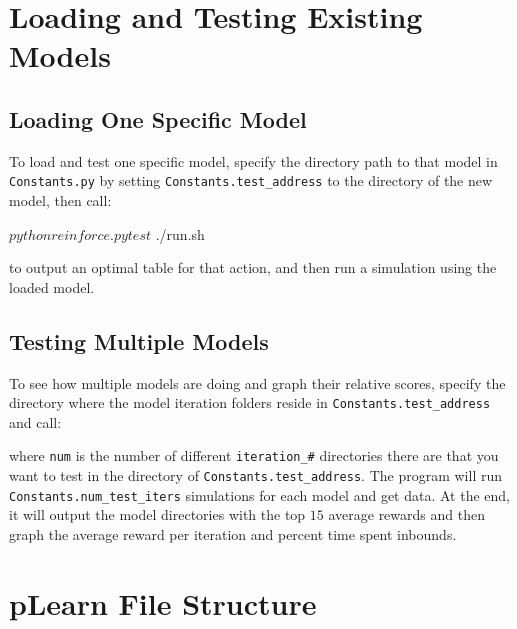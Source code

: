\documentclass[onecolumn,letterpaper,11pt]{article}
\begin{document}
\section{Loading and Testing Existing Models}

\subsection{Loading One Specific Model}
To load and test one specific model, specify the directory path to that model in \texttt{Constants.py} by setting \texttt{Constants.test\_address} to the directory of the new model, then call:

\vspace{0.15in}
\begin{fileverb} 
$ python reinforce.py test
$ ./run.sh	
\end{fileverb}
\vspace{0.15in}
 
to output an optimal table for that action, and then run a simulation using the loaded model.

\subsection{Testing Multiple Models}
To see how multiple models are doing and graph their relative
scores, specify the directory where the model iteration folders reside in \texttt{Constants.test\_address} and call:

\vspace{0.15in}
\vspace{0.15in}

where \texttt{num} is the number of different \texttt{iteration\_\#} directories there are that you want to test in the directory of \texttt{Constants.test\_address}. The program will run \texttt{Constants.num\_test\_iters} simulations for each model and get data. At the end, it will output the model directories with the top $15$ average rewards and then graph the average reward per iteration and percent time spent inbounds. 

\section{pLearn File Structure}
\end{document}
